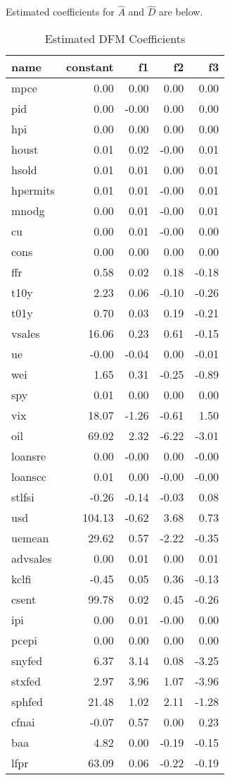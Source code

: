 \documentclass[11pt, letterpaper]{article}\usepackage[]{graphicx}\usepackage[]{color}
\begin{document}
Estimated coefficients for $\widehat{A}$ and $\widehat{D}$ are below.
\begin{table}[H]
\centering
\begingroup\footnotesize
\begin{tabular}{lrrrr}
  \hline
name & constant & f1 & f2 & f3 \\ 
  \hline
mpce & 0.00 & 0.00 & 0.00 & 0.00 \\ 
  pid & 0.00 & -0.00 & 0.00 & 0.00 \\ 
  hpi & 0.00 & 0.00 & 0.00 & 0.00 \\ 
  houst & 0.01 & 0.02 & -0.00 & 0.01 \\ 
  hsold & 0.01 & 0.01 & 0.00 & 0.01 \\ 
  hpermits & 0.01 & 0.01 & -0.00 & 0.01 \\ 
  mnodg & 0.00 & 0.01 & -0.00 & 0.01 \\ 
  cu & 0.00 & 0.01 & -0.00 & 0.00 \\ 
  cons & 0.00 & 0.00 & 0.00 & 0.00 \\ 
  ffr & 0.58 & 0.02 & 0.18 & -0.18 \\ 
  t10y & 2.23 & 0.06 & -0.10 & -0.26 \\ 
  t01y & 0.70 & 0.03 & 0.19 & -0.21 \\ 
  vsales & 16.06 & 0.23 & 0.61 & -0.15 \\ 
  ue & -0.00 & -0.04 & 0.00 & -0.01 \\ 
  wei & 1.65 & 0.31 & -0.25 & -0.89 \\ 
  spy & 0.01 & 0.00 & 0.00 & 0.00 \\ 
  vix & 18.07 & -1.26 & -0.61 & 1.50 \\ 
  oil & 69.02 & 2.32 & -6.22 & -3.01 \\ 
  loansre & 0.00 & -0.00 & 0.00 & -0.00 \\ 
  loanscc & 0.01 & 0.00 & -0.00 & -0.00 \\ 
  stlfsi & -0.26 & -0.14 & -0.03 & 0.08 \\ 
  usd & 104.13 & -0.62 & 3.68 & 0.73 \\ 
  uemean & 29.62 & 0.57 & -2.22 & -0.35 \\ 
  advsales & 0.00 & 0.01 & 0.00 & 0.01 \\ 
  kclfi & -0.45 & 0.05 & 0.36 & -0.13 \\ 
  csent & 99.78 & 0.02 & 0.45 & -0.26 \\ 
  ipi & 0.00 & 0.01 & -0.00 & 0.00 \\ 
  pcepi & 0.00 & 0.00 & 0.00 & 0.00 \\ 
  snyfed & 6.37 & 3.14 & 0.08 & -3.25 \\ 
  stxfed & 2.97 & 3.96 & 1.07 & -3.96 \\ 
  sphfed & 21.48 & 1.02 & 2.11 & -1.28 \\ 
  cfnai & -0.07 & 0.57 & 0.00 & 0.23 \\ 
  baa & 4.82 & 0.00 & -0.19 & -0.15 \\ 
  lfpr & 63.09 & 0.06 & -0.22 & -0.19 \\ 
   \hline
\end{tabular}
\endgroup
\caption{Estimated DFM Coefficients} 
\end{table}
\end{document}
